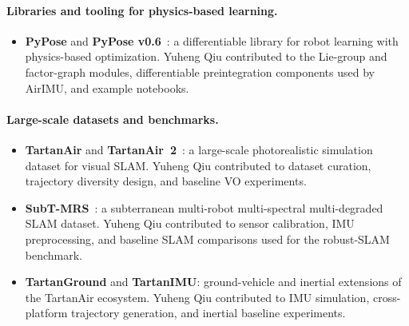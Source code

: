 \paragraph{Libraries and tooling for physics-based learning.}
\begin{itemize}
    \item \textbf{PyPose} and \textbf{PyPose v0.6}~\cite{wang2023pypose, zhan2023pypose}: a differentiable library for robot learning with physics-based optimization.
    Yuheng Qiu contributed to the Lie-group and factor-graph modules, differentiable preintegration components used by AirIMU, and example notebooks.
\end{itemize}

\paragraph{Large-scale datasets and benchmarks.}
\begin{itemize}
    \item \textbf{TartanAir} and \textbf{TartanAir~2}~\cite{tartanair2020iros}: a large-scale photorealistic simulation dataset for visual SLAM.
    Yuheng Qiu contributed to dataset curation, trajectory diversity design, and baseline VO experiments.
    \item \textbf{SubT-MRS}~\cite{zhao2023subt}: a subterranean multi-robot multi-spectral multi-degraded SLAM dataset.
    Yuheng Qiu contributed to sensor calibration, IMU preprocessing, and baseline SLAM comparisons used for the robust-SLAM benchmark.
    \item \textbf{TartanGround} and \textbf{TartanIMU}: ground-vehicle and inertial extensions of the TartanAir ecosystem.
    Yuheng Qiu contributed to IMU simulation, cross-platform trajectory generation, and inertial baseline experiments.
\end{itemize}


